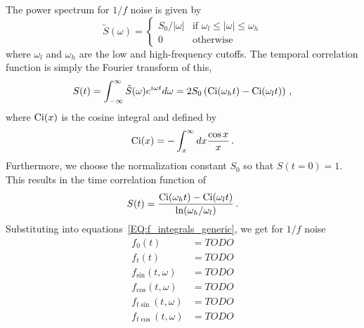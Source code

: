 The power spectrum for $1/f$ noise is given by
\begin{equation}
    \tilde{S}(\omega) =
    \begin{cases}
        S_0/|\omega| & \text{if } \omega_l \le |\omega| \le \omega_h \\
        0            & \text{otherwise}
    \end{cases}
\end{equation}
where $\omega_l$ and $\omega_h$ are the low and high-frequency cutoffs. The temporal correlation function is simply the Fourier transform of this,
\begin{equation*}
    S(t) = \int_{-\infty}^\infty \tilde{S}(\omega)e^{i\omega t}d\omega = 2S_0\left(\mathrm{Ci }(\omega_ht)-\mathrm{Ci }(\omega_lt)\right) \,,
\end{equation*}
where $\mathrm{Ci }(x)$ is the cosine integral and defined by
\begin{equation}
    \mathrm{Ci }(x) = -\int_x^\infty dx \frac{\cos x}{x} \,.
\end{equation}
Furthermore, we choose the normalization constant $S_0$ so that $S(t=0) = 1$.
This results in the time correlation function of
\begin{equation}
    S(t) = \frac{\mathrm{Ci }(\omega_ht)-\mathrm{Ci }(\omega_lt)}{\ln(\omega_h/\omega_l)} \,.
\end{equation}
Substituting into equations~\ref{EQ:f_integrals_generic}, we get for $1/f$ noise
\begin{subequations}
    \begin{align}
        f_0(t)              & = TODO \\
        f_t(t)              & = TODO \\
        f_{\sin}(t,\omega)  & = TODO \\
        f_{\cos}(t,\omega)  & = TODO \\
        f_{t\sin}(t,\omega) & = TODO \\
        f_{t\cos}(t,\omega) & = TODO
    \end{align}
\end{subequations}
